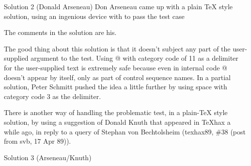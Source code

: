 \begin{solution}{Solution 2 (Donald Arseneau)}
Don Arseneau came up with a plain TeX style solution, using an
ingenious device with \cmd{\then} to pass the test case
\begin{lcode}
\expandafter\iffalse{}\fi
\end{lcode}
 The comments in the solution are his.

\end{solution}

The good thing about this solution is that it doesn't subject any part
of the user-supplied argument to the  test. Using @ with category
code of 11 as a delimiter for the user-supplied text is extremely safe
because even in internal code @ doesn't appear by itself, only as part
of control sequence names. In a partial solution, 
Peter Schmitt pushed
the idea a little further by using space with category code 3 as the
delimiter.

There is another way of handling the problematic  test, in a
plain-TeX style solution, by using a suggestion of Donald Knuth that
appeared in TeXhax a while ago, in reply to a query of Stephan von
Bechtolsheim (texhax89, \#38 (post from svb, 17 Apr 89)).

\begin{solution}{Solution 3 (Arseneau/Knuth)}
\end{solution}

